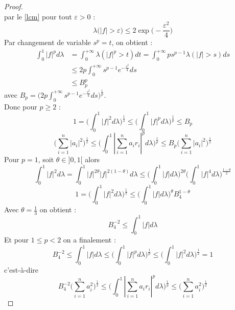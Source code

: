 \documentclass[12pt]{article}
\theoremstyle{definition}
\begin{document}
\begin{proof}
\begin{equation*}
	\end{equation*}
	par le \cref{lcm} pour tout $\varepsilon>0$ :
	\begin{equation*}
		\lambda\big(|f|>\varepsilon\big)\leq 2 \exp\big(-\frac{\varepsilon^2}{4}\big)
	\end{equation*}
	Par changement de variable $s^p=t$, on obtient :
	\begin{align*}
		\int_{0}^{1}|f|^p d\lambda &= \int_{0}^{+\infty}\lambda(|f|^p>t)dt = \int_{0}^{+\infty}p s^{p-1}\lambda(|f|>s)ds \\
		&\leq 2p\int_{0}^{+\infty}s^{p-1}e^{-\frac{s^2}{4}}ds\\
		&\leq B_p^p
	\end{align*}
	avec $B_p= \big(2p\int_{0}^{+\infty}s^{p-1}e^{-\frac{s^2}{4}}ds\big)^{\frac{1}{p}}$.\\
	Donc pour $p\geq 2$ : 
	\begin{equation*}
		1 =\big(\int_{0}^{1}|f|^2d\lambda\big)^{\frac{1}{2}}\leq \big(\int_{0}^{1}|f|^pd\lambda\big)^{\frac{1}{p}}\leq B_p
	\end{equation*}
	\begin{equation*}
		\big(\sum_{i=1}^{n}|a_i|^2\big)^{\frac{1}{2}} \leq \big(\int_{0}^{1}|\sum_{i=1}^{n}a_ir_i|^pd\lambda\big)^{\frac{1}{p}}\leq B_p\big(\sum_{i=1}^{n}|a_i|^2\big)^{\frac{1}{2}} 
	\end{equation*}
	Pour $p=1$, soit $\theta\in]0,1[$ alors 
	\begin{equation*}
		\int_{0}^{1}|f|^{2}d\lambda=\int_{0}^{1}|f|^{2\theta}|f|^{2(1-\theta)}d\lambda\leq\Bigg(\int_{0}^1 |f| d\lambda\Bigg)^{2\theta}\Bigg(\int_{0}^1|f|^{4}d\lambda\Bigg)^{\frac{1-\theta}{2}}
	\end{equation*}
	\begin{equation*}
		1 = \Bigg(\int_{0}^{1}|f|^{2}d\lambda\Bigg)^{\frac{1}{2}}\leq \Bigg(\int_{0}^1 |f| d\lambda\Bigg)^{\theta}B_4^{1-\theta}
	\end{equation*}
	Avec $\theta=\frac{1}{3}$ on obtient :
	\begin{equation*}
		B_4^{-2} \leq \int_{0}^1 |f| d\lambda
	\end{equation*}
	Et pour $1\leq p <2 $ on a finalement :
	\begin{equation*}
		B_4^{-2}\leq \int_{0}^1 |f| d\lambda \leq \Big(\int_0^1|f|^pd\lambda \Big)^{\frac{1}{p}}\leq \Big(\int_{0}^{1}|f|^{2}d\lambda\Big)^{\frac{1}{2}}=1
	\end{equation*}
	c'est-à-dire 
	\begin{equation*}
		B_4^{-2}\big(\sum_{i=1}^{n}a_i^2\big)^{\frac{1}{2}}\leq \Big(\int_0^1|\sum_{i=1}^{n}a_ir_i|^pd\lambda \Big)^{\frac{1}{p}}\leq \big(\sum_{i=1}^{n}a_i^2\big)^{\frac{1}{2}}
	\end{equation*}
	\end{proof}	
\nocite{GP}
\nocite{VM2}
\nocite{VMGS}
\printbibliography
\end{document}
